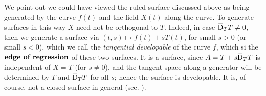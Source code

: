 \documentclass[../main]{subfiles}
\begin{document}
We point out we could have viewed the ruled surface discussed above as being generated by the curve $f(t)$ and the field $X(t)$ along the curve. To generate surfaces in this way $X$ need not be orthogonal to $T$. Indeed, in case $\covariant_TT\ne 0$, then we generate a surface via $(t,s) \mapsto f(t) + sT(t)$, for small $s> 0$ (or small $s < 0$), which we call the \emph{tangential developable} of the curve $f$, which si the $\emph{edge of regression}$ of these two surfaces. It is a surface, since $A = T+s\covariant_TT$ is independent of $X=T$ (for $s\ne 0$), and the tangent space along a generator will be determined by $T$ and $\covariant_TT$ for all $s$; hence the surface is developable. It is, of course, not a closed surface in general (see. \cite[p. 66]{struik1961lectures}). 
\begin{center}
\end{center}
\end{document}
